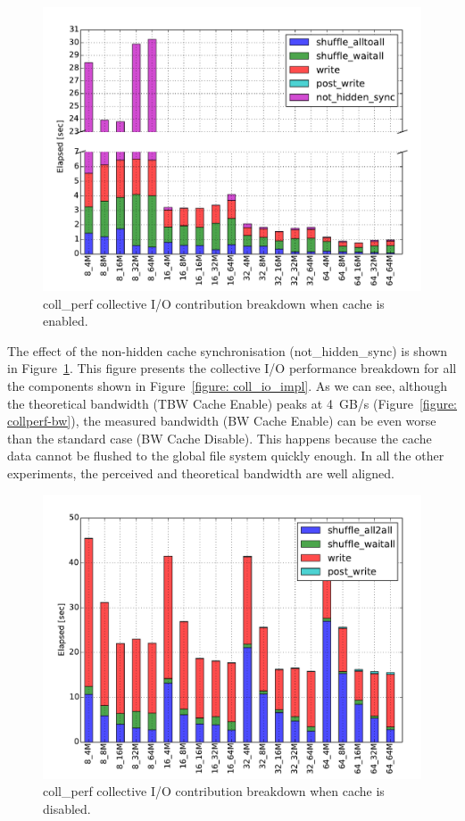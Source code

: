 \begin{figure}[b!]
  \centering
  \includegraphics[width=0.95\columnwidth]{figures/coll_perf_32GB_30sec_elapsed_enable}
  \caption{coll\_perf collective I/O contribution breakdown when cache is enabled.} %
  \label{figure: collperf-elaps-enable}
\end{figure}
The effect of the non-hidden cache synchronisation (not\_hidden\_sync) is shown in Figure~\ref{figure: collperf-elaps-enable}. This figure presents the collective I/O performance breakdown for all the components shown in Figure~\ref{figure: coll_io_impl}. As we can see, although the theoretical bandwidth (TBW Cache Enable) peaks at 4~GB/s (Figure~\ref{figure: collperf-bw}), the measured bandwidth (BW Cache Enable) can be even worse than the standard case (BW Cache Disable). This happens because the cache data cannot be flushed to the global file system quickly enough. In all the other experiments, the perceived and theoretical bandwidth are well aligned.

\begin{figure}[htb]
  \centering
  \includegraphics[width=0.95\columnwidth]{figures/coll_perf_32GB_30sec_elapsed_disable}
  \caption{coll\_perf collective I/O contribution breakdown when cache is disabled.}
  \label{figure: collperf-elaps-disable}
\end{figure}

